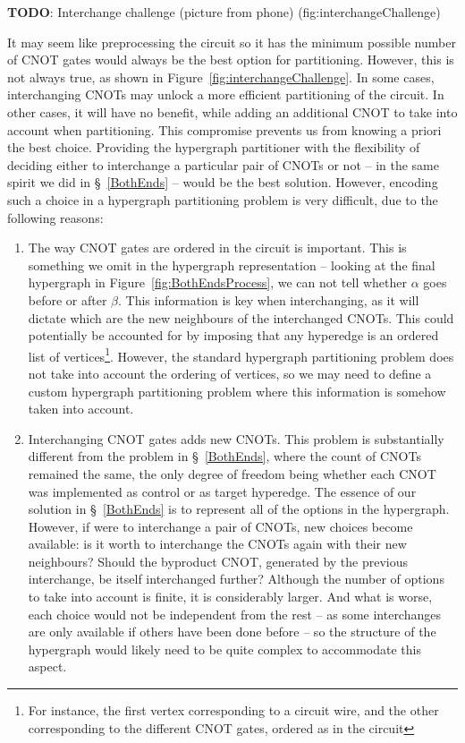 \textbf{TODO}: Interchange challenge (picture from phone) (fig:interchangeChallenge)

It may seem like preprocessing the circuit so it has the minimum possible number of CNOT gates would always be the best option for partitioning. However, this is not always true, as shown in Figure~\ref{fig:interchangeChallenge}. In some cases, interchanging CNOTs may unlock a more efficient partitioning of the circuit. In other cases, it will have no benefit, while adding an additional CNOT to take into account when partitioning. This compromise prevents us from knowing a priori the best choice. Providing the hypergraph partitioner with the flexibility of deciding either to interchange a particular pair of CNOTs or not -- in the same spirit we did in \S~\ref{BothEnds} -- would be the best solution. However, encoding such a choice in a hypergraph partitioning problem is very difficult, due to the following reasons:

\begin{enumerate}
  \item The way CNOT gates are ordered in the circuit is important. This is something we omit in the hypergraph representation -- looking at the final hypergraph in Figure~\ref{fig:BothEndsProcess}, we can not tell whether \(\alpha\) goes before or after \(\beta\). This information is key when interchanging, as it will dictate which are the new neighbours of the interchanged CNOTs. This could potentially be accounted for by imposing that any hyperedge is an ordered list of vertices\footnote{For instance, the first vertex corresponding to a circuit wire, and the other corresponding to the different CNOT gates, ordered as in the circuit}. However, the standard hypergraph partitioning problem does not take into account the ordering of vertices, so we may need to define a custom hypergraph partitioning problem where this information is somehow taken into account.
  \item Interchanging CNOT gates adds new CNOTs. This problem is substantially different from the problem in \S~\ref{BothEnds}, where the count of CNOTs remained the same, the only degree of freedom being whether each CNOT was implemented as control or as target hyperedge. The essence of our solution in \S~\ref{BothEnds} is to represent all of the options in the hypergraph. However, if were to interchange a pair of CNOTs, new choices become available: is it worth to interchange the CNOTs again with their new neighbours? Should the byproduct CNOT, generated by the previous interchange, be itself interchanged further? Although the number of options to take into account is finite, it is considerably larger. And what is worse, each choice would not be independent from the rest -- as some interchanges are only available if others have been done before -- so the structure of the hypergraph would likely need to be quite complex to accommodate this aspect.
\end{enumerate}

